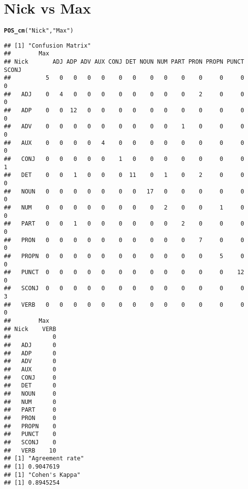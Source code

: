 \documentclass{article}\usepackage[]{graphicx}\usepackage[]{color}
\makeatletter
\newcommand{\hlstr}[1]{\textcolor[rgb]{0.192,0.494,0.8}{#1}}%
\newcommand{\hlstd}[1]{\textcolor[rgb]{0.345,0.345,0.345}{#1}}%
\newcommand{\hlkwd}[1]{\textcolor[rgb]{0.737,0.353,0.396}{\textbf{#1}}}%
\newenvironment{kframe}{%
 \def\at@end@of@kframe{}%
 \ifinner\ifhmode%
  \def\at@end@of@kframe{\end{minipage}}%
  \begin{minipage}{\columnwidth}%
 \fi\fi%
 \def\FrameCommand##1{\hskip\@totalleftmargin \hskip-\fboxsep
 \colorbox{shadecolor}{##1}\hskip-\fboxsep
     \hskip-\linewidth \hskip-\@totalleftmargin \hskip\columnwidth}%
 \MakeFramed {\advance\hsize-\width
   \@totalleftmargin\z@ \linewidth\hsize
   \@setminipage}}%
 {\par\unskip\endMakeFramed%
 \at@end@of@kframe}
\newenvironment{knitrout}{}{} %
\makeatother
\begin{document}
\section*{Nick vs Max}
\begin{knitrout}
\color{fgcolor}\begin{kframe}
\begin{alltt}
\hlkwd{POS_cm}\hlstd{(}\hlstr{"Nick"}\hlstd{,} \hlstr{"Max"}\hlstd{)}
\end{alltt}
\begin{verbatim}
## [1] "Confusion Matrix"
##        Max
## Nick       ADJ ADP ADV AUX CONJ DET NOUN NUM PART PRON PROPN PUNCT SCONJ
##          5   0   0   0   0    0   0    0   0    0    0     0     0     0
##   ADJ    0   4   0   0   0    0   0    0   0    0    2     0     0     0
##   ADP    0   0  12   0   0    0   0    0   0    0    0     0     0     0
##   ADV    0   0   0   0   0    0   0    0   0    1    0     0     0     0
##   AUX    0   0   0   0   4    0   0    0   0    0    0     0     0     0
##   CONJ   0   0   0   0   0    1   0    0   0    0    0     0     0     1
##   DET    0   0   1   0   0    0  11    0   1    0    2     0     0     0
##   NOUN   0   0   0   0   0    0   0   17   0    0    0     0     0     0
##   NUM    0   0   0   0   0    0   0    0   2    0    0     1     0     0
##   PART   0   0   1   0   0    0   0    0   0    2    0     0     0     0
##   PRON   0   0   0   0   0    0   0    0   0    0    7     0     0     0
##   PROPN  0   0   0   0   0    0   0    0   0    0    0     5     0     0
##   PUNCT  0   0   0   0   0    0   0    0   0    0    0     0    12     0
##   SCONJ  0   0   0   0   0    0   0    0   0    0    0     0     0     3
##   VERB   0   0   0   0   0    0   0    0   0    0    0     0     0     0
##        Max
## Nick    VERB
##            0
##   ADJ      0
##   ADP      0
##   ADV      0
##   AUX      0
##   CONJ     0
##   DET      0
##   NOUN     0
##   NUM      0
##   PART     0
##   PRON     0
##   PROPN    0
##   PUNCT    0
##   SCONJ    0
##   VERB    10
## [1] "Agreement rate"
## [1] 0.9047619
## [1] "Cohen's Kappa"
## [1] 0.8945254
\end{verbatim}
\end{kframe}
\end{knitrout}
\end{document}
